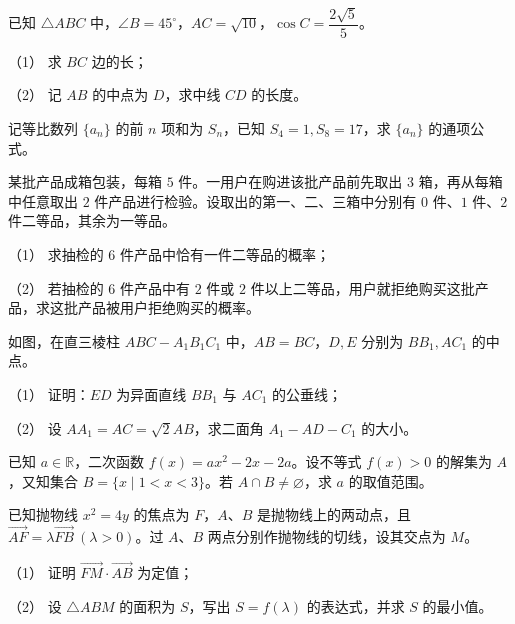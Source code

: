 \begin{question}
已知 $\triangle ABC$ 中，$\angle B=45^\circ$，$AC=\sqrt{10}$，$\cos C=\dfrac{2\sqrt5}{5}$。

（1） 求 $BC$ 边的长；

（2） 记 $AB$ 的中点为 $D$，求中线 $CD$ 的长度。

\end{question}
\begin{question}
记等比数列 $\{a_n\}$ 的前 $n$ 项和为 $S_n$，已知 $S_4=1,S_8=17$，求 $\{a_n\}$ 的通项公式。

\end{question}
\begin{question}
某批产品成箱包装，每箱 $5$ 件。一用户在购进该批产品前先取出 $3$ 箱，再从每箱中任意取出 $2$ 件产品进行检验。设取出的第一、二、三箱中分别有 $0$ 件、$1$ 件、$2$ 件二等品，其余为一等品。

（1） 求抽检的 $6$ 件产品中恰有一件二等品的概率；

（2） 若抽检的 $6$ 件产品中有 $2$ 件或 $2$ 件以上二等品，用户就拒绝购买这批产品，求这批产品被用户拒绝购买的概率。

\Needspace{0.4\textheight}
\end{question}
\begin{question}
如图，在直三棱柱 $ABC-A_1B_1C_1$ 中，$AB=BC$，$D,E$ 分别为 $BB_1,AC_1$ 的中点。
\nopagebreak[4]
\begin{center}\end{center}
\nopagebreak[4]
（1） 证明：$ED$ 为异面直线 $BB_1$ 与 $AC_1$ 的公垂线；

（2） 设 $AA_1=AC=\sqrt2AB$，求二面角 $A_1-AD-C_1$ 的大小。

\end{question}
\begin{question}
已知 $a\in\mathbb R$，二次函数 $f(x)=ax^2-2x-2a$。设不等式 $f(x)>0$ 的解集为 $A$，又知集合 $B=\{x\mid1<x<3\}$。若 $A\cap B\ne\varnothing$，求 $a$ 的取值范围。

\Needspace{0.4\textheight}
\end{question}
\begin{question}
已知抛物线 $x^2=4y$ 的焦点为 $F$，$A\text{、}B$ 是抛物线上的两动点，且 $\overrightarrow{AF}=\lambda\overrightarrow{FB}\ (\lambda>0)$。过 $A\text{、}B$ 两点分别作抛物线的切线，设其交点为 $M$。
\nopagebreak[4]
\begin{center}\end{center}
\nopagebreak[4]
（1） 证明 $\overrightarrow{FM}\cdot\overrightarrow{AB}$ 为定值；

（2） 设 $\triangle ABM$ 的面积为 $S$，写出 $S=f(\lambda)$ 的表达式，并求 $S$ 的最小值。

\end{question}
